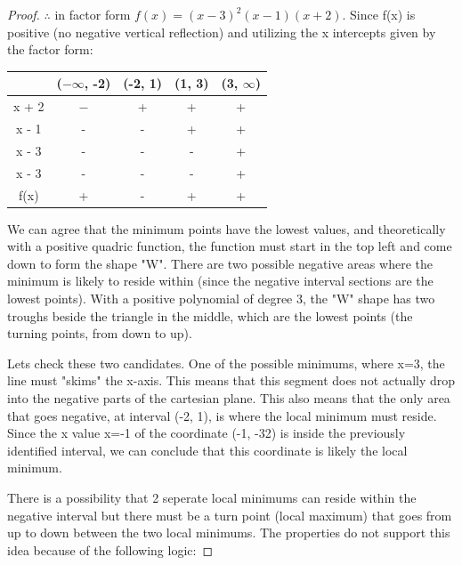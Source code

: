 \documentclass[12pt]{book}
\begin{document}
\begin{enumerate}
\begin{proof}
\newpage

$\therefore$ in factor form $f(x) = {(x-3)}^2(x-1)(x+2)$. Since f(x) is positive 
(no negative vertical reflection) and utilizing the x intercepts given by the factor form:

\begin{center}
    \begin{tabular}{|c|c|c|c|c|}
        \hline
        & ($-\infty$, -2) & (-2, 1) & (1, 3) & (3, $\infty$) \\ \hline
        x + 2 & $-$ & + & + & + \\ \hline
        x - 1 & - & - & + & + \\ \hline
        x - 3 & - & - & - & + \\ \hline
        x - 3 & - & - & - & + \\ \hline
        f(x) & + & - & + & + \\ \hline
    \end{tabular}
\end{center}

\vspace{0.5cm}
We can agree that the minimum points have the lowest values, and theoretically 
with a positive quadric function, the function must start in the top left and come down to form the shape "W".  
There are two possible negative areas where the minimum is likely to reside within 
(since the negative interval sections are the lowest points). 
With a positive polynomial of degree 3, the "W" shape has two troughs beside 
the triangle in the middle, which are the lowest points (the turning points, from down to up).

\vspace{0.5cm}
Lets check these two candidates. One of the possible minimums, where x=3, the line must "skims"
the x-axis. This means that this segment does not actually drop into the negative parts 
of the cartesian plane. This also means that the only area that goes negative, at interval (-2, 1),
is where the local minimum must reside. Since the x value x=-1 of the coordinate (-1, -32) is inside
the previously identified interval, we can conclude that this coordinate is likely the local minimum.

\vspace{0.5cm}
There is a possibility that 2 seperate local minimums can reside within the negative interval but 
there must be a turn point (local maximum) that goes from up to down between the two local minimums. The properties do not 
support this idea because of the following logic:


\end{proof}
\end{enumerate}
\end{document}
